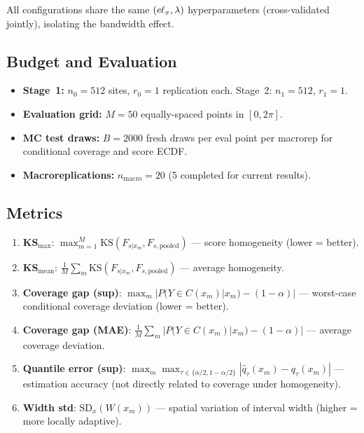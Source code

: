 \documentclass[11pt]{article}
\theoremstyle{remark}
\begin{document}
All configurations share the same $(e\kern-0.5pt\ell_x, \lambda)$
hyperparameters (cross-validated jointly), isolating the bandwidth
effect.

\subsection{Budget and Evaluation}

\begin{itemize}
  \item \textbf{Stage~1:} $n_0 = 512$ sites, $r_0 = 1$ replication
    each. Stage~2: $n_1 = 512$, $r_1 = 1$.
  \item \textbf{Evaluation grid:} $M = 50$ equally-spaced points in
    $[0, 2\pi]$.
  \item \textbf{MC test draws:} $B = 2000$ fresh draws per eval point
    per macrorep for conditional coverage and score ECDF.
  \item \textbf{Macroreplications:} $n_{\mathrm{macro}} = 20$
    (5 completed for current results).
\end{itemize}

\subsection{Metrics}

\begin{enumerate}
  \item \textbf{KS$_{\max}$}: $\max_{m=1}^{M}
    \mathrm{KS}(F_{s|x_m}, F_{s,\mathrm{pooled}})$ --- score
    homogeneity (lower = better).
  \item \textbf{KS$_{\mathrm{mean}}$}: $\frac{1}{M}\sum_m
    \mathrm{KS}(F_{s|x_m}, F_{s,\mathrm{pooled}})$ --- average
    homogeneity.
  \item \textbf{Coverage gap (sup)}:
    $\max_m |P(Y \in C(x_m)|x_m) - (1-\alpha)|$ --- worst-case
    conditional coverage deviation (lower = better).
  \item \textbf{Coverage gap (MAE)}:
    $\frac{1}{M}\sum_m |P(Y \in C(x_m)|x_m) - (1-\alpha)|$ ---
    average coverage deviation.
  \item \textbf{Quantile error (sup)}:
    $\max_m \max_{\tau \in \{\alpha/2, 1-\alpha/2\}}
    |\hat{q}_\tau(x_m) - q_\tau(x_m)|$ --- estimation accuracy
    (not directly related to coverage under homogeneity).
  \item \textbf{Width std}: $\mathrm{SD}_x(W(x_m))$ --- spatial
    variation of interval width (higher = more locally adaptive).
\end{enumerate}
\end{document}
